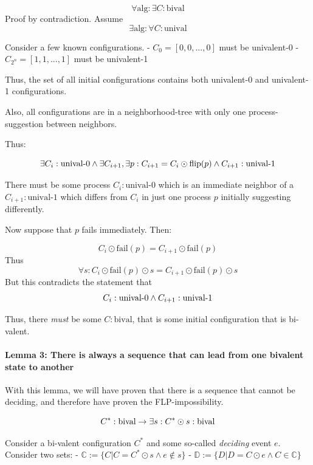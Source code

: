 \[
\forall \text{alg}: \exists C:\text{bival}
\] Proof by contradiction. Assume \[
\exists \text{alg}: \forall C:\text{unival}
\]

Consider a few known configurations. - \(C_0 = [0, 0, ..., 0]\) must be
univalent-0 - \(C_{2^n} = [1, 1, ..., 1]\) must be univalent-1

Thus, the set of all initial configurations contains both univalent-0
and univalent-1 configurations.

Also, all configurations are in a neighborhood-tree with only one
process-suggestion between neighbors.

Thus:

\[
\exists C_i:\text{unival-0} \\
\land \exists C_{i+1}, \exists p: C_{i+1} = C_i \odot \text{flip}(p) \\
\land C_{i+1}:\text{unival-1}
\]

There must be some process \(C_i:\text{unival-0}\) which is an immediate
neighbor of a \(C_{i+1}:\text{unival-1}\) which differs from \(C_i\) in
just one process \(p\) initially suggesting differently.

Now suppose that \(p\) fails immediately. Then:

\[
C_i \odot \text{fail}(p) = C_{i+1} \odot \text{fail}(p)
\] Thus \[
\forall s: C_i \odot \text{fail}(p) \odot s = C_{i+1} \odot \text{fail}(p) \odot s
\] But this contradicts the statement that \[
C_i:\text{unival-0} \\
\land C_{i+1}:\text{unival-1}
\]

Thus, there \emph{must} be some \(C:\text{bival}\), that is some initial
configuration that is bi-valent.

\hypertarget{lemma-3-there-is-always-a-sequence-that-can-lead-from-one-bivalent-state-to-another}{%
\paragraph{Lemma 3: There is always a sequence that can lead from one
bivalent state to
another}\label{lemma-3-there-is-always-a-sequence-that-can-lead-from-one-bivalent-state-to-another}}

With this lemma, we will have proven that there is a sequence that
cannot be deciding, and therefore have proven the FLP-impossibility.

\[
C^*:\text{bival} \to \exists s: C^* \odot s: \text{bival} \\
\]

Consider a bi-valent configuration \(C^*\) and some so-called
\emph{deciding} event \(e\). Consider two sets: -
\(\mathbb{C} := \{ C | C = C^* \odot s \land e \notin s \}\) -
\(\mathbb{D} := \{ D | D = C \odot e \land C \in \mathbb{C} \}\)



